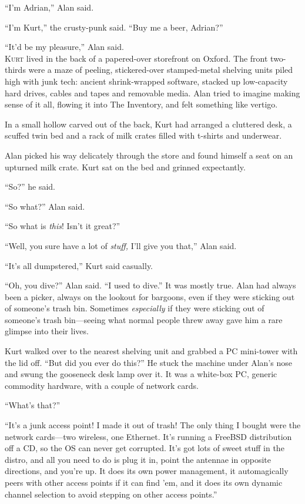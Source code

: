 ``I'm Adrian,'' Alan said.

``I'm Kurt,'' the crusty-punk said.  ``Buy me a beer, Adrian?''

``It'd be my pleasure,'' Alan said.
\\
\lettrine[lines=3, lhang=.5, nindent=0pt, findent=2pt]{K}{urt} lived in the back of a papered-over storefront on Oxford.  The
front two-thirds were a maze of peeling, stickered-over stamped-metal
shelving units piled high with junk tech:  ancient shrink-wrapped
software, stacked up low-capacity hard drives, cables and tapes and
removable media.  Alan tried to imagine making sense of it all,
flowing it into The Inventory, and felt something like vertigo.

In a small hollow carved out of the back, Kurt had arranged a
cluttered desk, a scuffed twin bed and a rack of milk crates filled
with t-shirts and underwear.

Alan picked his way delicately through the store and found himself a
seat on an upturned milk crate.  Kurt sat on the bed and grinned
expectantly.

``So?'' he said.

``So what?'' Alan said.

``So what is \textit{this}!  Isn't it great?''

``Well, you sure have a lot of \textit{stuff,} I'll give you that,''
Alan said.

``It's all dumpstered,'' Kurt said casually.

``Oh, you dive?'' Alan said.  ``I used to dive.'' It was mostly true. 
Alan had always been a picker, always on the lookout for bargoons,
even if they were sticking out of someone's trash bin.  Sometimes
\textit{especially} if they were sticking out of someone's trash
bin---seeing what normal people threw away gave him a rare glimpse
into their lives.

Kurt walked over to the nearest shelving unit and grabbed a PC
mini-tower with the lid off.  ``But did you ever do this?'' He stuck
the machine under Alan's nose and swung the gooseneck desk lamp over
it.  It was a white-box PC, generic commodity hardware, with a couple
of network cards.

``What's that?''

``It's a junk access point!  I made it out of trash!  The only thing I
bought were the network cards---two wireless, one Ethernet.  It's
running a FreeBSD distribution off a CD, so the OS can never get
corrupted.  It's got lots of sweet stuff in the distro, and all you
need to do is plug it in, point the antennae in opposite directions,
and you're up.  It does its own power management, it automagically
peers with other access points if it can find 'em, and it does its own
dynamic channel selection to avoid stepping on other access points.''

